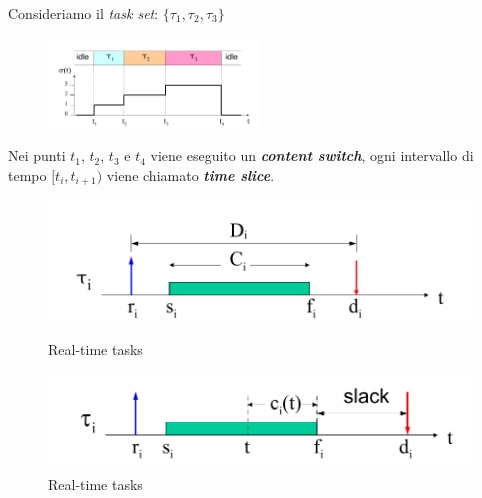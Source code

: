 Consideriamo il \textit{task set}: $\{\tau_1, \tau_2, \tau_3\}$
\begin{figure}[h]
    \centering
    \includegraphics[width=0.5\textwidth]{img/time_sched}
\end{figure}
\newline
Nei punti $t_1$, $t_2$, $t_3$ e $t_4$ viene eseguito un \textbf{\textit{content switch}}, ogni intervallo di tempo $[t_i, t_{i+1})$ viene chiamato \textbf{\textit{time slice}}.
\begin{figure}[h]
    \centering
    \begin{minipage}[t]{0.45\textwidth}
        \centering
        \includegraphics[width=\textwidth]{img/rt_task}
        \caption{Real-time tasks}
    \end{minipage}
    \begin{minipage}[t]{0.45\textwidth}
        \centering
        \includegraphics[width=\textwidth]{img/rt_task_1}
        \caption{Real-time tasks}
    \end{minipage}
\end{figure}
